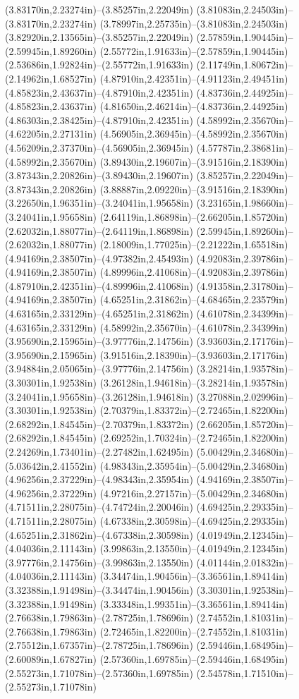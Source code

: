 (3.83170in,2.23274in)--(3.85257in,2.22049in) (3.81083in,2.24503in)--(3.83170in,2.23274in) (3.78997in,2.25735in)--(3.81083in,2.24503in) (3.82920in,2.13565in)--(3.85257in,2.22049in) (2.57859in,1.90445in)--(2.59945in,1.89260in) (2.55772in,1.91633in)--(2.57859in,1.90445in) (2.53686in,1.92824in)--(2.55772in,1.91633in) (2.11749in,1.80672in)--(2.14962in,1.68527in) (4.87910in,2.42351in)--(4.91123in,2.49451in) (4.85823in,2.43637in)--(4.87910in,2.42351in) (4.83736in,2.44925in)--(4.85823in,2.43637in) (4.81650in,2.46214in)--(4.83736in,2.44925in) (4.86303in,2.38425in)--(4.87910in,2.42351in) (4.58992in,2.35670in)--(4.62205in,2.27131in) (4.56905in,2.36945in)--(4.58992in,2.35670in) (4.56209in,2.37370in)--(4.56905in,2.36945in) (4.57787in,2.38681in)--(4.58992in,2.35670in) (3.89430in,2.19607in)--(3.91516in,2.18390in) (3.87343in,2.20826in)--(3.89430in,2.19607in) (3.85257in,2.22049in)--(3.87343in,2.20826in) (3.88887in,2.09220in)--(3.91516in,2.18390in) (3.22650in,1.96351in)--(3.24041in,1.95658in) (3.23165in,1.98660in)--(3.24041in,1.95658in) (2.64119in,1.86898in)--(2.66205in,1.85720in) (2.62032in,1.88077in)--(2.64119in,1.86898in) (2.59945in,1.89260in)--(2.62032in,1.88077in) (2.18009in,1.77025in)--(2.21222in,1.65518in) (4.94169in,2.38507in)--(4.97382in,2.45493in) (4.92083in,2.39786in)--(4.94169in,2.38507in) (4.89996in,2.41068in)--(4.92083in,2.39786in) (4.87910in,2.42351in)--(4.89996in,2.41068in) (4.91358in,2.31780in)--(4.94169in,2.38507in) (4.65251in,2.31862in)--(4.68465in,2.23579in) (4.63165in,2.33129in)--(4.65251in,2.31862in) (4.61078in,2.34399in)--(4.63165in,2.33129in) (4.58992in,2.35670in)--(4.61078in,2.34399in) (3.95690in,2.15965in)--(3.97776in,2.14756in) (3.93603in,2.17176in)--(3.95690in,2.15965in) (3.91516in,2.18390in)--(3.93603in,2.17176in) (3.94884in,2.05065in)--(3.97776in,2.14756in) (3.28214in,1.93578in)--(3.30301in,1.92538in) (3.26128in,1.94618in)--(3.28214in,1.93578in) (3.24041in,1.95658in)--(3.26128in,1.94618in) (3.27088in,2.02996in)--(3.30301in,1.92538in) (2.70379in,1.83372in)--(2.72465in,1.82200in) (2.68292in,1.84545in)--(2.70379in,1.83372in) (2.66205in,1.85720in)--(2.68292in,1.84545in) (2.69252in,1.70324in)--(2.72465in,1.82200in) (2.24269in,1.73401in)--(2.27482in,1.62495in) (5.00429in,2.34680in)--(5.03642in,2.41552in) (4.98343in,2.35954in)--(5.00429in,2.34680in) (4.96256in,2.37229in)--(4.98343in,2.35954in) (4.94169in,2.38507in)--(4.96256in,2.37229in) (4.97216in,2.27157in)--(5.00429in,2.34680in) (4.71511in,2.28075in)--(4.74724in,2.20046in) (4.69425in,2.29335in)--(4.71511in,2.28075in) (4.67338in,2.30598in)--(4.69425in,2.29335in) (4.65251in,2.31862in)--(4.67338in,2.30598in) (4.01949in,2.12345in)--(4.04036in,2.11143in) (3.99863in,2.13550in)--(4.01949in,2.12345in) (3.97776in,2.14756in)--(3.99863in,2.13550in) (4.01144in,2.01832in)--(4.04036in,2.11143in) (3.34474in,1.90456in)--(3.36561in,1.89414in) (3.32388in,1.91498in)--(3.34474in,1.90456in) (3.30301in,1.92538in)--(3.32388in,1.91498in) (3.33348in,1.99351in)--(3.36561in,1.89414in) (2.76638in,1.79863in)--(2.78725in,1.78696in) (2.74552in,1.81031in)--(2.76638in,1.79863in) (2.72465in,1.82200in)--(2.74552in,1.81031in) (2.75512in,1.67357in)--(2.78725in,1.78696in) (2.59446in,1.68495in)--(2.60089in,1.67827in) (2.57360in,1.69785in)--(2.59446in,1.68495in) (2.55273in,1.71078in)--(2.57360in,1.69785in) (2.54578in,1.71510in)--(2.55273in,1.71078in) 